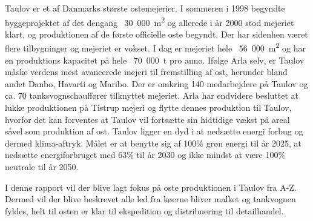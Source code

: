 Taulov er et af Danmarks største ostemejerier. I sommeren i 1998 begyndte byggeprojektet af det dengang \SI{}{30.000\metre\squared} og allerede i år 2000 stod mejeriet klart, og produktionen af de første officielle oste begyndt. 
Der har sidenhen været flere tilbygninger og mejeriet er vokset. I dag er mejeriet hele \SI{}{56.000\metre\squared} og har en produktions kapacitet på hele \SI{}{70.000\tonne} pro anno. Ifølge Arla selv, er Taulov måske verdens mest avancerede mejeri til fremstilling af ost, herunder bland andet Danbo, Havarti og Maribo. Der er omkring 140 medarbejdere på Taulov og ca. 70 tanksvognschauffører tilknyttet mejeriet. 
Arla har endvidere besluttet at lukke produktionen på Tistrup mejeri og flytte dennes produktion til Taulov, hvorfor det kan forventes at Taulov vil fortsætte sin hidtidige vækst på areal såvel som produktion af ost. 
Taulov ligger en dyd i at nedsætte energi forbug og dermed klima-aftryk. Målet er at benytte sig af 100\% grøn energi til år 2025, at nedsætte energiforbruget med 63\% til år 2030 og ikke mindst at være 100\%  neutrale til år 2050. 

I denne rapport vil der blive lagt fokus på oste produktionen i Taulov fra A-Z. Dermed vil der blive beskrevet alle led fra køerne bliver malket og tankvognen fyldes, helt til osten er klar til ekspedition og distribuering til detailhandel. 

